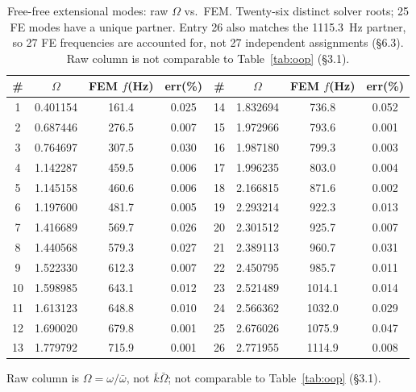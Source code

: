 \documentclass[11pt]{article}
\begin{document}
\begin{table}[!htb]\centering\scriptsize
\caption{Free-free extensional modes: raw $\Omega$ vs.\ FEM.
Twenty-six distinct solver roots; 25 FE modes have a unique partner.
Entry 26 also matches the 1115.3~Hz partner, so 27 FE frequencies are
accounted for, not 27 independent assignments (\S6.3). Raw column is not comparable to
Table~\ref{tab:oop} (\S3.1).}
\label{tab:ip}
\begin{tabular}{cccc|cccc}
\toprule \# & $\Omega$ & FEM $f$(Hz) & err(\%) & \# & $\Omega$ & FEM $f$(Hz) & err(\%)\\ \midrule
1 & 0.401154 & 161.4 & 0.025 & 14 & 1.832694 & 736.8 & 0.052\\
2 & 0.687446 & 276.5 & 0.007 & 15 & 1.972966 & 793.6 & 0.001\\
3 & 0.764697 & 307.5 & 0.030 & 16 & 1.987180 & 799.3 & 0.003\\
4 & 1.142287 & 459.5 & 0.006 & 17 & 1.996235 & 803.0 & 0.004\\
5 & 1.145158 & 460.6 & 0.006 & 18 & 2.166815 & 871.6 & 0.002\\
6 & 1.197600 & 481.7 & 0.005 & 19 & 2.293214 & 922.3 & 0.013\\
7 & 1.416689 & 569.7 & 0.026 & 20 & 2.301512 & 925.7 & 0.007\\
8 & 1.440568 & 579.3 & 0.027 & 21 & 2.389113 & 960.7 & 0.031\\
9 & 1.522330 & 612.3 & 0.007 & 22 & 2.450795 & 985.7 & 0.011\\
10 & 1.598985 & 643.1 & 0.012 & 23 & 2.521489 & 1014.1 & 0.014\\
11 & 1.613123 & 648.8 & 0.010 & 24 & 2.566362 & 1032.0 & 0.029\\
12 & 1.690020 & 679.8 & 0.001 & 25 & 2.676026 & 1075.9 & 0.047\\
13 & 1.779792 & 715.9 & 0.001 & 26 & 2.771955 & 1114.9 & 0.008\\
\bottomrule
\end{tabular}

\vspace{0.25em}
{\footnotesize Raw column is $\Omega=\omega/\bar\omega$, not
$\bar k\bar\Omega$; not comparable to Table~\ref{tab:oop} (\S3.1).}
\end{table}
\end{document}
